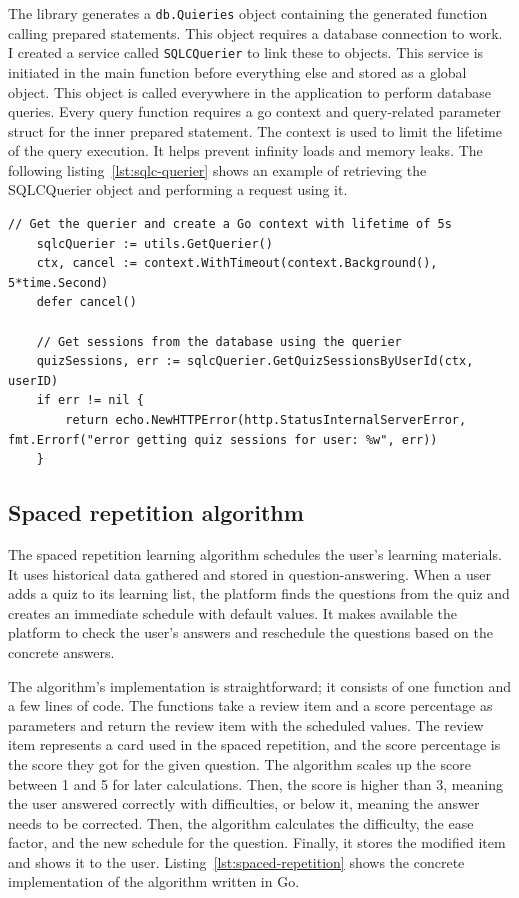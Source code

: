 The library generates a \texttt{db.Quieries} object containing the generated function calling prepared statements. This object requires a database connection to work. I created a service called \texttt{SQLCQuerier} to link these to objects. This service is initiated in the main function before everything else and stored as a global object. This object is called everywhere in the application to perform database queries. Every query function requires a go context and query-related parameter struct for the inner prepared statement. The context is used to limit the lifetime of the query execution. It helps prevent infinity loads and memory leaks. The following listing~\ref{lst:sqlc-querier} shows an example of retrieving the SQLCQuerier object and performing a request using it.

\begin{lstlisting}[caption=Using the SQLCQuerier,label=lst:sqlc-querier]
	// Get the querier and create a Go context with lifetime of 5s
	sqlcQuerier := utils.GetQuerier()
	ctx, cancel := context.WithTimeout(context.Background(), 5*time.Second)
	defer cancel()

	// Get sessions from the database using the querier
	quizSessions, err := sqlcQuerier.GetQuizSessionsByUserId(ctx, userID)
	if err != nil {
		return echo.NewHTTPError(http.StatusInternalServerError, fmt.Errorf("error getting quiz sessions for user: %w", err))
	}
\end{lstlisting}

\subsection{Spaced repetition algorithm}

The spaced repetition learning algorithm schedules the user's learning materials. It uses historical data gathered and stored in question-answering. When a user adds a quiz to its learning list, the platform finds the questions from the quiz and creates an immediate schedule with default values. It makes available the platform to check the user's answers and reschedule the questions based on the concrete answers.

The algorithm's implementation is straightforward; it consists of one function and a few lines of code. The functions take a review item and a score percentage as parameters and return the review item with the scheduled values. The review item represents a card used in the spaced repetition, and the score percentage is the score they got for the given question. The algorithm scales up the score between 1 and 5 for later calculations. Then, the score is higher than 3, meaning the user answered correctly with difficulties, or below it, meaning the answer needs to be corrected. Then, the algorithm calculates the difficulty, the ease factor, and the new schedule for the question. Finally, it stores the modified item and shows it to the user. Listing~\ref{lst:spaced-repetition} shows the concrete implementation of the algorithm written in Go.

